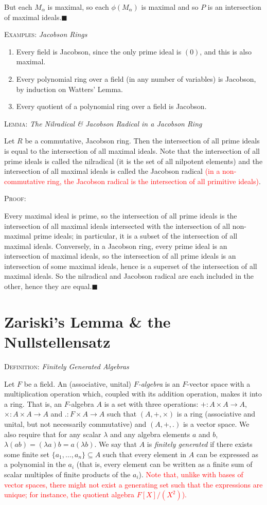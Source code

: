 \documentclass[12pt,a4paper]{article}
\newcommand{\proof}{\noindent\textsc{\large Proof:}\par}
\newcommand{\defn}[1]{\noindent\textsc{\large Definition:}  \textit{\large #1}\par}
\newcommand{\lemma}[1]{\noindent\textsc{\large Lemma:}  \textit{\large #1}\par}
\newcommand{\example}[1]{\noindent\textsc{\large Examples:}  \textit{\large #1}\par}
\newcommand{\qed}{\hfill$\blacksquare$\gap}
\newcommand{\red}[1]{\textcolor{red}{#1}}
\newcommand{\gap}{\par \vspace{5mm}}
\begin{document}
But each $M_\alpha$ is maximal, so each $\phi(M_\alpha)$ is maximal and so $P$ is an intersection of maximal ideals.\qed


\example{Jacobson Rings}
\begin{enumerate}
\item Every field is Jacobson, since the only prime ideal is $(0)$, and this is also maximal.
\item Every polynomial ring over a field (in any number of variables) is Jacobson, by induction on Watters' Lemma.
\item Every quotient of a polynomial ring over a field is Jacobson.
\end{enumerate}

\lemma{The Nilradical \& Jacobson Radical in a Jacobson Ring}
Let $R$ be a commutative, Jacobson ring. Then the intersection of all prime ideals is equal to the intersection of all maximal ideals. Note that the intersection of all prime ideals is called the nilradical (it is the set of all nilpotent elements) and the intersection of all maximal ideals is called the Jacobson radical \red{(in a non-commutative ring, the Jacobson radical is the intersection of all primitive ideals)}.\gap

\proof
Every maximal ideal is prime, so the intersection of all prime ideals is the intersection of all maximal ideals intersected with the intersection of all non-maximal prime ideals; in particular, it is a subset of the intersection of all maximal ideals. Conversely, in a Jacobson ring, every prime ideal is an intersection of maximal ideals, so the intersection of all prime ideals is an intersection of some maximal ideals, hence is a superset of the intersection of all maximal ideals. So the nilradical and Jacobson radical are each included in the other, hence they are equal.\qed




\section{Zariski's Lemma \& the Nullstellensatz}

\defn{Finitely Generated Algebras}
Let $F$ be a field. An (associative, unital) \textit{$F$-algebra} is an $F$-vector space with a multiplication operation which, coupled with its addition operation, makes it into a ring. That is, an $F$-algebra $A$ is a set with three operations: $+:A\times A\to A$, $\times:A\times A\to A$ and $.:F\times A\to A$ such that $(A,+,\times)$ is a ring (associative and unital, but not necessarily commutative) and $(A,+,.)$ is a vector space. We also require that for any scalar $\lambda$ and any algebra elements $a$ and $b$, $\lambda(ab)=(\lambda a)b=a(\lambda b)$. We say that $A$ is \textit{finitely generated} if there exists some finite set $\{a_1,\hdots,a_n\}\subseteq A$ such that every element in $A$ can be expressed as a polynomial in the $a_i$ (that is, every element can be written as a finite sum of scalar multiples of finite products of the $a_i$). \red{Note that, unlike with bases of vector spaces, there might not exist a generating set such that the expressions are unique; for instance, the quotient algebra $F[X]/(X^2)$).}\gap
\end{document}
